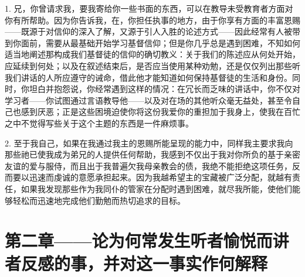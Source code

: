 1. 兄，你曾请求我，要我寄给你一些书面的东西，可以在教导未受教育者方面对你有所帮助。因为你告诉我，在，你担任执事的地方，由于你享有方面的丰富恩赐——既源于对信仰的深入了解，又源于引人入胜的论述方式——因此经常有人被带到你面前，需要从最基础开始学习基督信仰；但是你几乎总是遇到困难，不知如何适当地阐述那构成我们基督徒的信仰的确切教义：关于我们的陈述应从何处开始，应延续到何处；以及在叙述结束后，是否应当使用某种劝勉，还是仅仅列出那些听我们讲话的人所应遵守的诫命，借此他才能知道如何保持基督徒的生活和身份。同时，你坦白并抱怨说，你经常遇到这样的情况：在冗长而乏味的讲话中，你不仅对学习者——你试图通过言语教导他——以及对在场的其他听众毫无益处，甚至令自己也感到厌恶；正是这些困境迫使你将这份我爱你的重担加于我身上，使我在百忙之中不觉得写些关于这个主题的东西是一件麻烦事。\par

2. 至于我自己，如果在我通过我主的恩赐所能呈现的能力中，同样我主要求我向那些祂已使我成为弟兄的人提供任何帮助，我感到不仅出于我对你所负的基于亲密友谊的爱与服侍，而且出于我普遍欠我母亲教会的债，我绝不能拒绝这项任务，反而要以迅速而虔诚的意愿承担起来。因为我越希望主的宝藏被广泛分配，就越有责任，如果我发现那些作为我同仆的管家在分配时遇到困难，就尽我所能，使他们能够轻松而迅速地完成他们勤勉而热切追求的目标。\par


\section{第二章——论为何常发生听者愉悦而讲者反感的事，并对这一事实作何解释}

